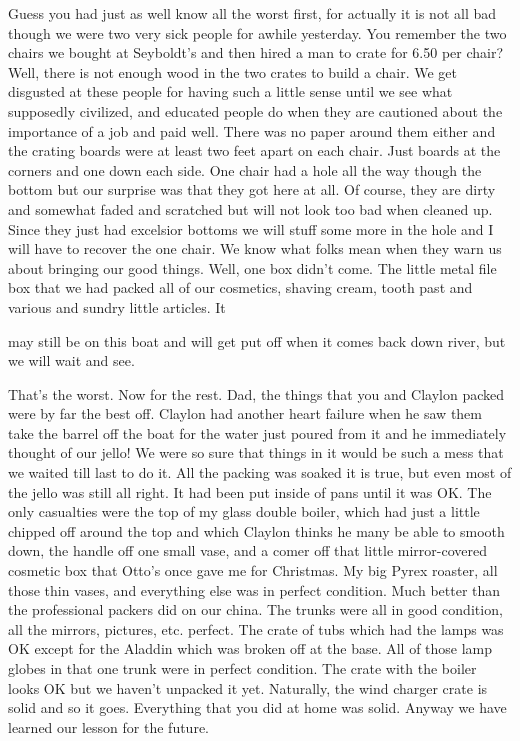 \documentclass[
]{book}
\begin{document}
Guess you had just as well know all the worst first, for actually it is not all bad though we were two very sick people for awhile yesterday. You remember the two chairs we bought at Seyboldt's and then hired a man to crate for 6.50 per chair? Well, there is not enough wood in the two crates to build a chair. We get disgusted at these people for having such a little sense until we see what supposedly civilized, and educated people do when they are cautioned about the importance of a job and paid well. There was no paper around them either and the crating boards were at least two feet apart on each chair. Just boards at the corners and one down each side. One chair had a hole all the way though the bottom but our surprise was that they got here at all. Of course, they are dirty and somewhat faded and scratched but will not look too bad when cleaned up. Since they just had excelsior bottoms we will stuff some more in the hole and I will have to recover the one chair. We know what folks mean when they warn us about bringing our good things. Well, one box didn't come. The little metal file box that we had packed all of our cosmetics, shaving cream, tooth past and various and sundry little articles. It

may still be on this boat and will get put off when it comes back down river, but we will wait and see.

That's the worst. Now for the rest. Dad, the things that you and Claylon packed were by far the best off. Claylon had another heart failure when he saw them take the barrel off the boat for the water just poured from it and he immediately thought of our jello! We were so sure that things in it would be such a mess that we waited till last to do it. All the packing was soaked it is true, but even most of the jello was still all right. It had been put inside of pans until it was OK. The only casualties were the top of my glass double boiler, which had just a little chipped off around the top and which Claylon thinks he many be able to smooth down, the handle off one small vase, and a comer off that little mirror-covered cosmetic box that Otto's once gave me for Christmas. My big Pyrex roaster, all those thin vases, and everything else was in perfect condition. Much better than the professional packers did on our china. The trunks were all in good condition, all the mirrors, pictures, etc. perfect. The crate of tubs which had the lamps was OK except for the Aladdin which was broken off at the base. All of those lamp globes in that one trunk were in perfect condition. The crate with the boiler looks OK but we haven't unpacked it yet. Naturally, the wind charger crate is solid and so it goes. Everything that you did at home was solid. Anyway we have learned our lesson for the future.
\end{document}
